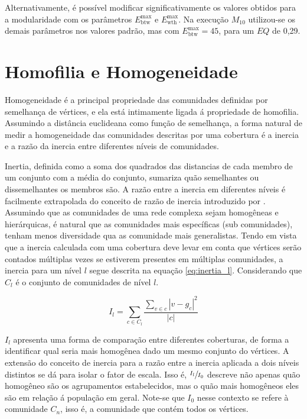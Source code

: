 \documentclass[notes.tex]{subfiles}
\begin{document}
Alternativamente, é possível modificar significativamente os valores obtidos para a modularidade com os parâmetros $E_\text{btw}^\text{max}$ e $E_\text{wth}^\text{max}$.
Na execução $M_{10}$ utilizou-se os demais parâmetros nos valores padrão, mas com $E_\text{btw}^\text{max}=45$, para um $EQ$ de 0,29.

\section{Homofilia e Homogeneidade}

Homogeneidade é a principal propriedade das comunidades definidas por semelhança de vértices, e ela está intimamente ligada á propriedade de homofilia.
Assumindo a distância euclideana como função de semelhança, a forma natural de medir a homogeneidade das comunidades descritas por uma cobertura é a inercia e a razão da inercia entre diferentes níveis de comunidades.

Inertia, definida como a soma dos quadrados das distancias de cada membro de um conjunto com a média do conjunto, sumariza quão semelhantes ou dissemelhantes os membros são.
A razão entre a inercia em diferentes níveis é facilmente extrapolada do conceito de razão de inercia introduzido por .
Assumindo que as comunidades de uma rede complexa sejam homogêneas e hierárquicas, é natural que as comunidades mais específicas (sub comunidades), tenham menos diversidade qua as comunidade mais generalistas.
Tendo em vista que a inercia calculada com uma cobertura deve levar em conta que vértices serão contados múltiplas vezes se estiverem presentes em múltiplas comunidades, a inercia para um nível $l$ segue descrita na equação \ref{eq:inertia_l}.
Considerando que $C_l$ é o conjunto de comunidades de nível  $l$.

\begin{equation}
    I_l = \sum_{c \in C_l}\frac{\sum_{v \in c} |v-g_c|^2}{|c|}
\end{equation}

$I_l$ apresenta uma forma de comparação entre diferentes coberturas, de forma a identificar qual seria mais homogênea dado um mesmo conjunto do vértices.
A extensão do conceito de inercia para a razão entre a inercia aplicada a dois níveis distintos se dá para isolar o fator de escala.
Isso é, $\sfrac{I_l}{I_0}$ descreve não apenas quão homogêneo são os agrupamentos estabelecidos, mas o quão mais homogêneos eles são em relação á população em geral.
Note-se que $I_0$ nesse contexto se refere à comunidade $C_n$, isso é, a comunidade que contém todos os vértices.
\end{document}
